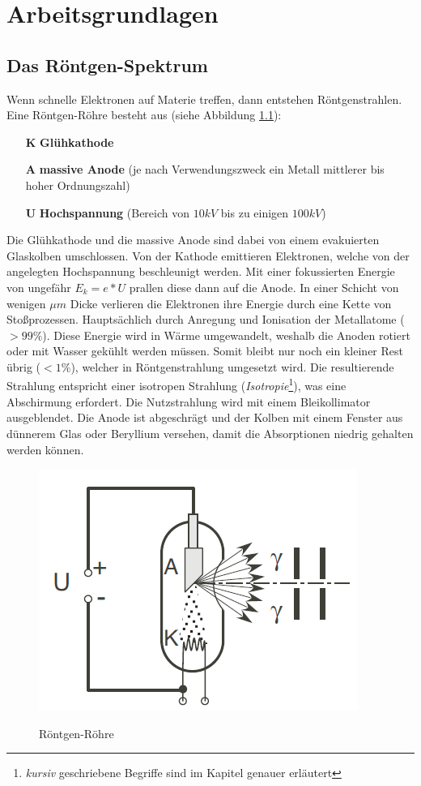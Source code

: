 \chapter{Arbeitsgrundlagen}
\setcounter{page}{1} \thispagestyle{fancy} 
\section{Das Röntgen-Spektrum}
Wenn schnelle Elektronen auf Materie treffen, dann entstehen Röntgenstrahlen. Eine Röntgen-Röhre besteht aus (siehe Abbildung \ref{fig:roentgen_roehre}):
\begin{itemize}
\item[\textbf{K}] \textbf{Glühkathode}
\item[\textbf{A}] \textbf{massive Anode} (je nach Verwendungszweck ein Metall mittlerer bis hoher Ordnungszahl)
\item[\textbf{U}] \textbf{Hochspannung} (Bereich von $10kV$ bis zu einigen $100kV$)
\end{itemize}
Die Glühkathode und die massive Anode sind dabei von einem evakuierten Glaskolben umschlossen. Von der Kathode emittieren Elektronen, welche von der angelegten Hochspannung beschleunigt werden. Mit einer fokussierten Energie von ungefähr $E_{k} = e*U$ prallen diese dann auf die Anode. In einer Schicht von wenigen $\mu m$ Dicke verlieren die Elektronen ihre Energie durch eine Kette von Stoßprozessen. Hauptsächlich durch Anregung und Ionisation der Metallatome ($>99\%$). Diese Energie wird in Wärme umgewandelt, weshalb die Anoden rotiert oder mit Wasser gekühlt werden müssen. Somit bleibt nur noch ein kleiner Rest übrig ($<1\%$), welcher in Röntgenstrahlung umgesetzt wird. Die resultierende Strahlung entspricht einer isotropen Strahlung (\textit{Isotropie}\footnote{\textit{kursiv} geschriebene Begriffe sind im Kapitel  genauer erläutert}), was eine Abschirmung erfordert. Die Nutzstrahlung wird mit einem Bleikollimator ausgeblendet. Die Anode ist abgeschrägt und der Kolben mit einem Fenster aus dünnerem Glas oder Beryllium versehen, damit die Absorptionen  niedrig gehalten werden können.
\begin{figure}[h]
\centering
\includegraphics[scale=1.5]{Bilder/roentgen_roehre.png} 
\label{fig:roentgen_roehre}
\caption{Röntgen-Röhre}
\end{figure}
\newpage

